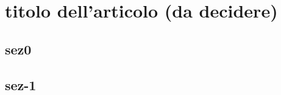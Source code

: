
\chapter{titolo dell'articolo (da decidere)}
\label{chp:----}

\section{sez0}
\label{sec:0}

\lipsum[1-5]


\section{sez-1}
\label{sec:1}

\lipsum[6-12]